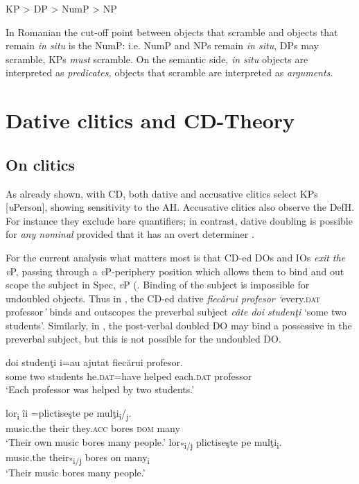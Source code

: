 \documentclass[output=paper,colorlinks,citecolor=brown,nonflat]{langsci/langscibook}
\begin{document}
\ea%
      \label{ex:cornilescu:22}
        KP   >   DP   > NumP   > NP

      \z


In Romanian the cut-off point between objects that scramble and objects that remain \textit{in situ} is the NumP: i.e. NumP and NPs remain \textit{in situ}, DPs may scramble, KPs \textit{must} scramble. On the semantic side, \textit{in situ} objects are interpreted as \textit{predicates,} objects that scramble are interpreted as \textit{arguments.}

\section{Dative clitics and CD-Theory} %

\subsection{{On} {clitics}}

As already shown, with CD, both dative and accusative clitics select KPs [\textit{u}Person], showing sensitivity to the AH. Accusative clitics also observe the DefH. For instance they exclude bare quantifiers; in contrast, dative doubling is possible for \textit{any nominal} provided that it has an overt determiner \citep{Cornilescu2017}.

For the current analysis what matters most is that CD-ed DOs and IOs \textit{exit the v}P, passing through a \textit{v}P-periphery position which allows them to bind and out scope the subject in Spec, \textit{v}P (\citealt{Dobrovie-Sorin1994, CornilescuDinuTigău2017DOC,Tigau2011}. Binding of the subject is impossible for undoubled objects. Thus in , the CD-ed dative \textit{fiecărui profesor ‘}every.\textsc{dat} professor\textit{’} binds and outscopes the preverbal subject \textit{câte doi studenţi} ‘some two students’. Similarly, in , the post-verbal doubled DO may bind a possessive in the preverbal subject, but this is not possible for the undoubled DO.

\ea%
      \label{ex:cornilescu:27}
       {doi} {studenţi} {i=au}  {ajutat} {fiecărui} {profesor}.\\
            some two students he.\textsc{dat}=have helped each.\textsc{dat} professor\\
      \glt ‘Each professor was helped by two students.’
      \z


\ea%
      \label{ex:cornilescu:28}
      \ea
       {lor\textsubscript{i}} {îi} {=plictiseşte}  {pe} mulţi\textsubscript{i}/\textsubscript{j}.\\
      		music.the their they.\textsc{acc} bores \textsc{dom} many\\
      \glt ‘Their own music bores many people.’
      \ex
       {lor\textsubscript{*i/j}}  {plictiseşte} {pe} {mulţi\textsubscript{i}}.	\\
      	 music.the their\textsubscript{*i/j} bores on many\textsubscript{i}\\
      \glt  ‘Their music bores many people.’
      \z
      \z
\end{document}
